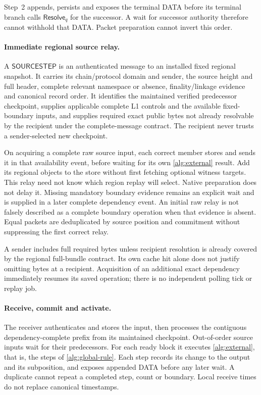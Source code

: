 \documentclass[11pt,a4paper]{article}
\newcommand{\tagg}[1]{\ensuremath{\mathsf{#1}}}
\newcounter{protocol}
\begin{document}
Step~2 appends, persists and exposes the terminal DATA before its
terminal branch calls $\tagg{Resolve}_q$ for the successor.  A wait for successor
authority therefore cannot withhold that DATA. Packet preparation cannot
invert this order.

\paragraph{Immediate regional source relay.}
A \tagg{SOURCESTEP} is an authenticated message to an installed fixed
regional snapshot. It carries its chain/protocol domain and sender,
the source height and full header, complete relevant namespace or
absence, finality/linkage evidence and canonical record order. It
identifies the maintained verified predecessor checkpoint, supplies
applicable complete L1 controls and the available fixed-boundary
inputs, and supplies required exact public bytes not already resolvable
by the recipient under the complete-message contract. The
recipient never trusts a sender-selected new checkpoint.

On acquiring a complete raw source input, each correct member stores
and sends it in that availability event, before waiting for its own
\cref{alg:external} result. Add its regional objects to the store
without first fetching optional witness targets. This relay
need not know which region replay will select. Native preparation does
not delay it. Missing mandatory boundary evidence remains an explicit
wait and is supplied in a later complete dependency event. An initial
raw relay is not falsely described as a complete boundary operation
when that evidence is absent. Equal packets are deduplicated by source
position and commitment without suppressing the first correct relay.

A sender includes full required bytes unless recipient resolution is
already covered by the regional full-bundle contract. Its own cache hit
alone does not justify omitting bytes at a recipient. Acquisition of an
additional exact dependency immediately resumes its saved operation;
there is no independent polling tick or replay job.

\paragraph{Receive, commit and activate.}
The receiver authenticates and stores the input, then processes the
contiguous dependency-complete prefix from its maintained checkpoint.
Out-of-order source inputs wait for their predecessors. For each ready
block it executes \cref{alg:external}, that is, the steps of
\cref{alg:global-rule}. Each step records its change to the output and
its subposition, and exposes appended DATA before any later wait. A
duplicate cannot repeat a completed step, count or boundary. Local
receive times do not replace canonical timestamps.
\end{document}

